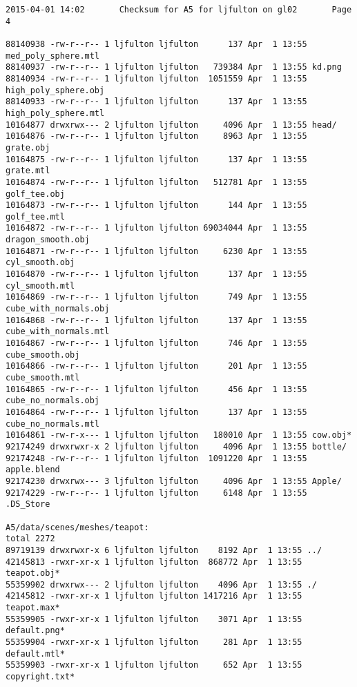 \documentclass[12pt]{article}
\begin{document}
\begin{verbatim}
2015-04-01 14:02       Checksum for A5 for ljfulton on gl02       Page 4

88140938 -rw-r--r-- 1 ljfulton ljfulton      137 Apr  1 13:55 med_poly_sphere.mtl
88140937 -rw-r--r-- 1 ljfulton ljfulton   739384 Apr  1 13:55 kd.png
88140934 -rw-r--r-- 1 ljfulton ljfulton  1051559 Apr  1 13:55 high_poly_sphere.obj
88140933 -rw-r--r-- 1 ljfulton ljfulton      137 Apr  1 13:55 high_poly_sphere.mtl
10164877 drwxrwx--- 2 ljfulton ljfulton     4096 Apr  1 13:55 head/
10164876 -rw-r--r-- 1 ljfulton ljfulton     8963 Apr  1 13:55 grate.obj
10164875 -rw-r--r-- 1 ljfulton ljfulton      137 Apr  1 13:55 grate.mtl
10164874 -rw-r--r-- 1 ljfulton ljfulton   512781 Apr  1 13:55 golf_tee.obj
10164873 -rw-r--r-- 1 ljfulton ljfulton      144 Apr  1 13:55 golf_tee.mtl
10164872 -rw-r--r-- 1 ljfulton ljfulton 69034044 Apr  1 13:55 dragon_smooth.obj
10164871 -rw-r--r-- 1 ljfulton ljfulton     6230 Apr  1 13:55 cyl_smooth.obj
10164870 -rw-r--r-- 1 ljfulton ljfulton      137 Apr  1 13:55 cyl_smooth.mtl
10164869 -rw-r--r-- 1 ljfulton ljfulton      749 Apr  1 13:55 cube_with_normals.obj
10164868 -rw-r--r-- 1 ljfulton ljfulton      137 Apr  1 13:55 cube_with_normals.mtl
10164867 -rw-r--r-- 1 ljfulton ljfulton      746 Apr  1 13:55 cube_smooth.obj
10164866 -rw-r--r-- 1 ljfulton ljfulton      201 Apr  1 13:55 cube_smooth.mtl
10164865 -rw-r--r-- 1 ljfulton ljfulton      456 Apr  1 13:55 cube_no_normals.obj
10164864 -rw-r--r-- 1 ljfulton ljfulton      137 Apr  1 13:55 cube_no_normals.mtl
10164861 -rw-r-x--- 1 ljfulton ljfulton   180010 Apr  1 13:55 cow.obj*
92174249 drwxrwxr-x 2 ljfulton ljfulton     4096 Apr  1 13:55 bottle/
92174248 -rw-r--r-- 1 ljfulton ljfulton  1091220 Apr  1 13:55 apple.blend
92174230 drwxrwx--- 3 ljfulton ljfulton     4096 Apr  1 13:55 Apple/
92174229 -rw-r--r-- 1 ljfulton ljfulton     6148 Apr  1 13:55 .DS_Store

A5/data/scenes/meshes/teapot:
total 2272
89719139 drwxrwxr-x 6 ljfulton ljfulton    8192 Apr  1 13:55 ../
42145813 -rwxr-xr-x 1 ljfulton ljfulton  868772 Apr  1 13:55 teapot.obj*
55359902 drwxrwx--- 2 ljfulton ljfulton    4096 Apr  1 13:55 ./
42145812 -rwxr-xr-x 1 ljfulton ljfulton 1417216 Apr  1 13:55 teapot.max*
55359905 -rwxr-xr-x 1 ljfulton ljfulton    3071 Apr  1 13:55 default.png*
55359904 -rwxr-xr-x 1 ljfulton ljfulton     281 Apr  1 13:55 default.mtl*
55359903 -rwxr-xr-x 1 ljfulton ljfulton     652 Apr  1 13:55 copyright.txt*


\end{verbatim}
\end{document}
